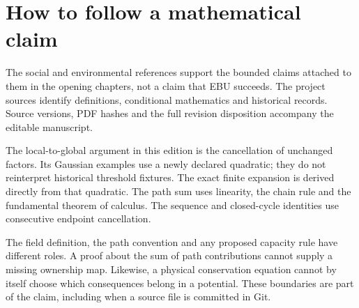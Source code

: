 \section*{How to follow a mathematical claim}
The social and environmental references support the bounded claims attached to
them in the opening chapters, not a claim that EBU succeeds. The project
sources identify definitions, conditional mathematics and historical records.
Source versions, PDF hashes and the full revision disposition accompany the
editable manuscript.

The local-to-global argument in this edition is the cancellation of unchanged
factors. Its Gaussian examples use a newly declared quadratic; they do not
reinterpret historical threshold fixtures. The exact finite expansion is
derived directly from that quadratic. The path sum uses linearity, the chain
rule and the fundamental theorem of calculus. The sequence and closed-cycle
identities use consecutive endpoint cancellation.

The field definition, the path convention and any proposed capacity rule have
different roles. A proof about the sum of path contributions cannot supply a
missing ownership map. Likewise, a physical conservation equation cannot by
itself choose which consequences belong in a potential. These boundaries are
part of the claim, including when a source file is committed in Git.
